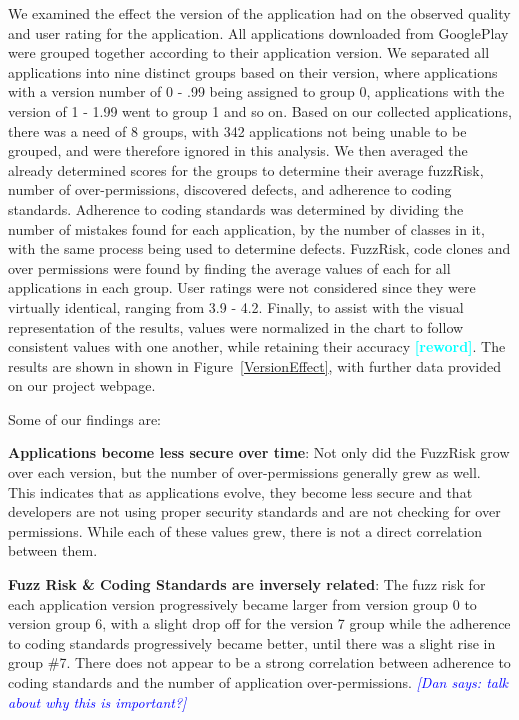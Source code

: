 \documentclass{sig-alternate}
\newcommand{\todo}[1]{\textcolor{cyan}{\textbf{[#1]}}}
\newcommand{\dan}[1]{\textcolor{blue}{{\it [Dan says: #1]}}}
\begin{document}
We examined the effect the version of the application had on the observed quality and user rating for the application. All applications downloaded from GooglePlay were grouped together according to their application version. We separated all applications into nine distinct groups based on their version, where applications with a version number of 0 - .99 being assigned to group 0, applications with the version of 1 - 1.99 went to group 1 and so on. Based on our collected applications, there was a need of 8 groups, with 342 applications not being unable to be grouped, and were therefore ignored in this analysis. We then averaged the already determined scores for the groups to determine their average fuzzRisk, number of over-permissions,  discovered defects, and adherence to coding standards. Adherence to coding standards was determined by dividing the number of mistakes found for each application, by the number of classes in it, with the same process being used to determine defects. FuzzRisk, code clones and over permissions were found by finding the average values of each for all applications in each group. User ratings were not considered since they were virtually identical, ranging from 3.9 - 4.2. Finally, to assist with the visual representation of the results, values were normalized in the chart to follow consistent values with one another, while retaining their accuracy \todo{reword}. The results are shown in shown in Figure~\ref{VersionEffect}, with further data provided on our project webpage.

Some of our findings are:

\textbf{Applications become less secure over time}: Not only did the FuzzRisk grow over each version, but the number of over-permissions generally grew as well. This indicates that as applications evolve, they become less secure and that developers are not using proper security standards and are not checking for over permissions. While each of these values grew, there is not a direct correlation between them.


\textbf{Fuzz Risk \& Coding Standards are inversely related}:  The fuzz risk for each application version progressively became larger from version group 0 to version group 6, with a slight drop off for the version 7 group while the adherence to coding standards progressively became better, until there was a slight rise in group \#7. There does not appear to be a strong correlation between adherence to coding standards and the number of application over-permissions. \dan{talk about why this is important?}
\end{document}
